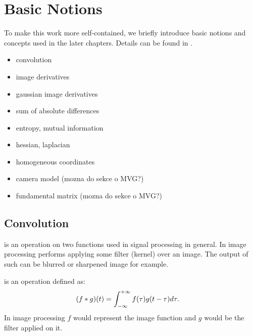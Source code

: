 \chapter{Basic Notions} 
\label{chap:notions}

To make this work more self-contained, we briefly introduce basic notions and concepts used in the later chapters. 
Details can be found in .

\begin{framed} 
\begin{itemize} 
\item convolution 
\item image derivatives 
\item gaussian image derivatives 
\item sum of absolute differences 
\item entropy, mutual information 
\item hessian, laplacian 
\item homogeneous coordinates 
\item camera model (mozna do sekce o MVG?) 
\item fundamental matrix (mozna do sekce o MVG?) 
\end{itemize} 
\end{framed} 

\section{Convolution}

 is an operation on two functions used in signal processing in general.
In image processing  performs applying some filter (kernel) over an image.
The output of such  can be blurred or sharpened image for example.

\begin{definition}
 is an operation defined as:
\begin{align*}
(f* g)(t)&=\int_{-\infty}^{+\infty} f(\tau)g(t -\tau) d\tau.
\end{align*}
In image processing $f$ would represent the image function and $g$ would be the filter applied on it.
\end{definition} 


